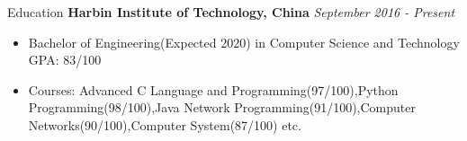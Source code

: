 \documentclass{resume} %
\begin{document}

\begin{rSection}{Education}
{\bf Harbin Institute of Technology, China} \hfill {\em September 2016 - Present} 
    \begin{itemize}[itemsep=-0.3em]
        \item Bachelor of Engineering(Expected 2020) in Computer Science and Technology\hfill { GPA: 83/100 }
        \item Courses: Advanced C Language and Programming(97/100),Python Programming(98/100),Java Network Programming(91/100),Computer Networks(90/100),Computer System(87/100) etc.
    \end{itemize}
\end{rSection}
\end{document}
